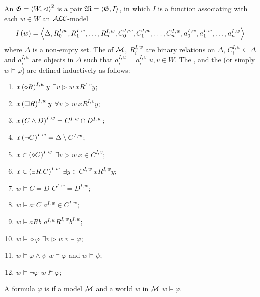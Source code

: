 \begin{defi}
An  $\mathfrak{G}=\left\langle W,\vartriangleleft\right\rangle^2$ is a pair $\mathfrak{M}=\left\langle \mathfrak{G},I\right\rangle$, in which $I$ is a function associating with each $w\in W$ an $\mathcal{A}\mathcal{L}\mathcal{C}$-model
\begin{equation}
I\left(w\right)=\left\langle \Delta,R_0^{I,w},R_1^{I,w},\ldots,R_n^{I,w},C_0^{I,w},C_1^{I,w},\ldots,C_n^{I,w},a_0^{I,w},a_1^{I,w},\ldots,a_n^{I,w}\right\rangle
\end{equation}
where $\Delta$ is a non-empty set. The  of $\mathcal{M}$, $R_i^{I,w}$ are binary relations on $\Delta$, $C_i^{I,w}\subseteq\Delta$ and $a_i^{I,w}$ are objects in $\Delta$ such that $a_i^{I,u}=a_i^{I,v}$ \fanTx{} $u,v\in W$. The , and the  (or simply $w\vDash\varphi$) are defined inductively as follows:
\begin{enumerate}
 \item $x\left( \diamond R\right)^{I,w}y$ \iffTx{} $\exists v\vartriangleright w\ xR^{I,v}y$;
 \item $x\left( \square R\right)^{I,w}y$ \iffTx{} $\forall v\vartriangleright w\ xR^{I,v}y$;
 \item $x\left( C\wedge D\right)^{I,w}=C^{I,w}\cap D^{I,w}$;
 \item $x\left( \neg C\right)^{I,w}=\Delta\setminus C^{I,w}$;
 \item $x\in\left( \diamond C\right)^{I,w}$ \iffTx{} $\exists v\vartriangleright w\ x\in C^{I,v}$;
 \item $x\in\left( \exists R.C\right)^{I,w}$ \iffTx{} $\exists y\in C^{I,w}\ xR^{I,w}y$;
 \item $w\vDash C=D$ \iffTx{} $C^{I,w}=D^{I,w}$;
 \item $w\vDash a:C$ \iffTx{} $a^{I,w}\in C^{I,w}$;
 \item $w\vDash aRb$ \iffTx{} $a^{I,w}R^{I,w}b^{I,w}$;
 \item $w\vDash\diamond\varphi$ \iffTx{} $\exists v\vartriangleright w\ v\vDash\varphi$;
 \item $w\vDash\varphi\wedge\psi$ \iffTx{} $w\vDash\varphi$ and $w\vDash\psi$;
 \item $w\vDash\neg\varphi$ \iffTx{} $w\not\vDash\varphi$;
\end{enumerate}
A formula $\varphi$ is  if \tiTx{} a model $\mathcal{M}$ and a world $w$ in $\mathcal{M}$ \stTx{} $w\vDash\varphi$.
\cite{conf/ijcai/WolterZ99}
\end{defi}

